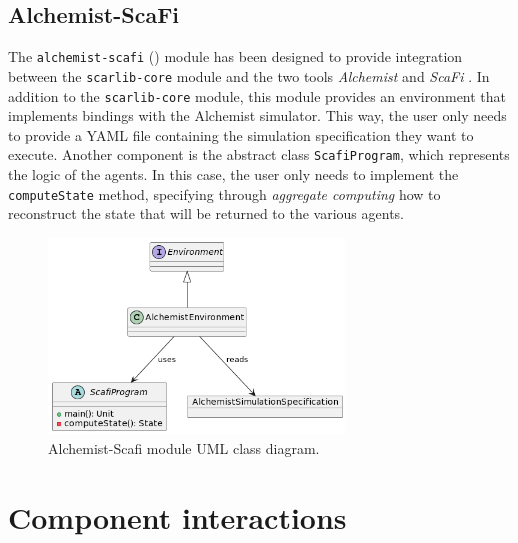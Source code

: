 \documentclass[12pt,a4paper,openright,twoside]{book}
\begin{document}
\subsection*{Alchemist-ScaFi}

The \texttt{alchemist-scafi} () module has been designed to provide integration between the \texttt{scarlib-core} module 
    and the two tools \emph{Alchemist} \cite{alchemist} and \emph{ScaFi} \cite{casadei2022scafi}. 
    In addition to the \texttt{scarlib-core} module, this module provides an environment that implements bindings 
    with the Alchemist simulator. This way, the user only needs to provide a YAML file containing the 
    simulation specification they want to execute. 
    Another component is the abstract class \texttt{ScafiProgram}, which represents the logic of the agents. 
    In this case, the user only needs to implement the \texttt{computeState} method, specifying through \emph{aggregate 
    computing} how to reconstruct the state that will be returned to the various agents.

\begin{figure}[t]
    \centering
    \includegraphics[width=0.7\textwidth]{figures/alchemist-scafi-uml.png}
    \caption{Alchemist-Scafi module UML class diagram.}
    \label{fig:alchemist-scafi}
\end{figure}

\section{Component interactions}
\end{document}
